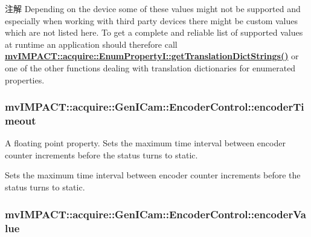 \begin{DoxyNote}{注解}
Depending on the device some of these values might not be supported and especially when working with third party devices there might be custom values which are not listed here. To get a complete and reliable list of supported values at runtime an application should therefore call {\bfseries \hyperlink{classmv_i_m_p_a_c_t_1_1acquire_1_1_enum_property_i_a0ba6ccbf5ee69784d5d0b537924d26b6}{mv\+I\+M\+P\+A\+C\+T\+::acquire\+::\+Enum\+Property\+I\+::get\+Translation\+Dict\+Strings()}} or one of the other functions dealing with translation dictionaries for enumerated properties. 
\end{DoxyNote}
\hypertarget{classmv_i_m_p_a_c_t_1_1acquire_1_1_gen_i_cam_1_1_encoder_control_a677351d73e21b249dfe42edbd15211a7}{
\subsubsection[{encoder\+Timeout}]{ mv\+I\+M\+P\+A\+C\+T\+::acquire\+::\+Gen\+I\+Cam\+::\+Encoder\+Control\+::encoder\+Timeout}}\label{classmv_i_m_p_a_c_t_1_1acquire_1_1_gen_i_cam_1_1_encoder_control_a677351d73e21b249dfe42edbd15211a7}


A floating point property. Sets the maximum time interval between encoder counter increments before the status turns to static. 

Sets the maximum time interval between encoder counter increments before the status turns to static. \hypertarget{classmv_i_m_p_a_c_t_1_1acquire_1_1_gen_i_cam_1_1_encoder_control_a155593f156aca42831131b788eb25b63}{
\subsubsection[{encoder\+Value}]{ mv\+I\+M\+P\+A\+C\+T\+::acquire\+::\+Gen\+I\+Cam\+::\+Encoder\+Control\+::encoder\+Value}}\label{classmv_i_m_p_a_c_t_1_1acquire_1_1_gen_i_cam_1_1_encoder_control_a155593f156aca42831131b788eb25b63}


